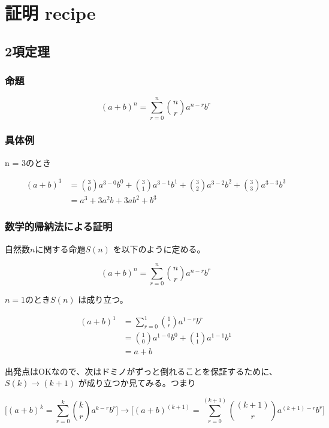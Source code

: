 \documentclass[dvipdfmx]{jsarticle}
\begin{document}
\newcommand{\highlight}[3][yellow]{\tikz[baseline=(x.base)]{\node[rectangle,rounded corners,fill=#1!10](x){#2} node[below of=x, color=#1]{#3};}}

\section{証明 recipe}

\subsection{2項定理}

\subsubsection{命題}
\[ (a + b)^n = \sum_{r=0}^{n} \binom nr a^{n-r}b^r \]

\subsubsection{具体例}
n = 3のとき

\begin{align*}
  (a + b)^3 &= \binom {3}{0} a^{3-0}b^0 + \binom {3}{1} a^{3-1}b^1 + \binom {3}{2} a^{3-2}b^2 + \binom {3}{3} a^{3-3}b^3 \\
            &= a^3 + 3a^2b + 3ab^2 + b^3
\end{align*}

\subsubsection{数学的帰納法による証明}

$自然数nに関する命題S(n)$ を以下のように定める。

\[ (a + b)^n = \sum_{r=0}^{n} \binom nr a^{n-r}b^{r} \]

$n = 1のときS(n)$ は成り立つ。

\begin{align*}
  (a + b)^1 &= \sum_{r=0}^{1} \binom{1}{r} a^{1-r}b^r \\
            &= \binom{1}{0}a^{1-0}b^0 + \binom {1}{1} a^{1-1}b^1 \\
            &= a + b
\end{align*}

出発点はOKなので、次はドミノがずっと倒れることを保証するために、$S(k) \rightarrow (k+1)$ が成り立つか見てみる。つまり

\[ \biggl[ (a + b) ^k = \sum_{r=0}^{k} \binom{k}{r} a^{k-r}b^r \biggl] \rightarrow \biggl[(a + b)^{(k+1)} = \sum_{r=0}^{(k+1)} \binom{(k+1)}{r} a^{(k+1)-r}b^r \biggl] \]
\end{document}
